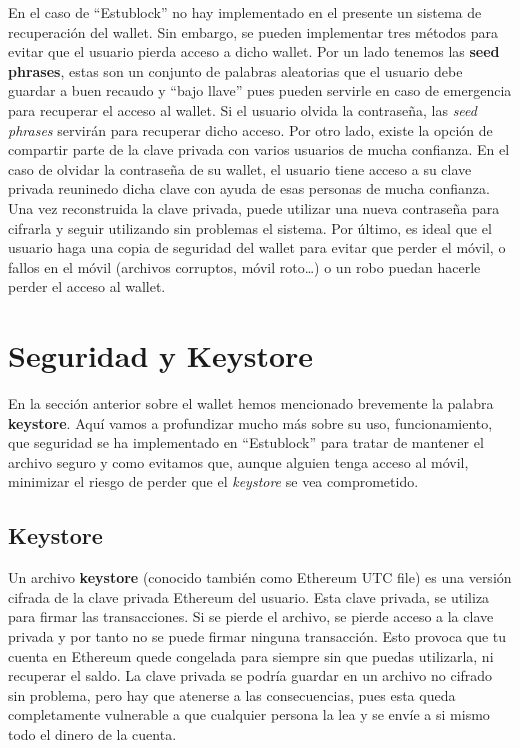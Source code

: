 En el caso de ``Estublock'' no hay implementado en el presente un sistema de recuperación del wallet. Sin embargo, se pueden implementar tres métodos para evitar que el usuario pierda acceso a dicho wallet. Por un lado tenemos las \textbf{seed phrases}, estas son un conjunto de palabras aleatorias que el usuario debe guardar a buen recaudo y ``bajo llave'' pues pueden servirle en caso de emergencia para recuperar el acceso al wallet. Si el usuario olvida la contraseña, las \emph{seed phrases} servirán para recuperar dicho acceso. Por otro lado, existe la opción de compartir parte de la clave privada con varios usuarios de mucha confianza. En el caso de olvidar la contraseña de su wallet, el usuario tiene acceso a su clave privada reuninedo dicha clave con ayuda de esas personas de mucha confianza. Una vez reconstruida la clave privada, puede utilizar una nueva contraseña para cifrarla y seguir utilizando sin problemas el sistema. Por último, es ideal que el usuario haga una copia de seguridad del wallet para evitar que perder el móvil, o fallos en el móvil (archivos corruptos, móvil roto\dots) o un robo puedan hacerle perder el acceso al wallet. 



\section{Seguridad y Keystore}

En la sección anterior sobre el wallet hemos mencionado brevemente la palabra \textbf{keystore}. Aquí vamos a profundizar mucho más sobre su uso, funcionamiento, que seguridad se ha implementado en ``Estublock'' para tratar de mantener el archivo seguro y como evitamos que, aunque alguien tenga acceso al móvil, minimizar el riesgo de perder que el \emph{keystore} se vea comprometido. \\

\subsection{Keystore}

Un archivo \textbf{keystore} (conocido también como Ethereum UTC file) es una versión cifrada de la clave privada Ethereum del usuario. Esta clave privada, se utiliza para firmar las transacciones. Si se pierde el archivo, se pierde acceso a la clave privada y por tanto no se puede firmar ninguna transacción. Esto provoca que tu cuenta en Ethereum quede congelada para siempre sin que puedas utilizarla, ni recuperar el saldo. La clave privada se podría guardar en un archivo no cifrado sin problema, pero hay que atenerse a las consecuencias, pues esta queda completamente vulnerable a que cualquier persona la lea y se envíe a si mismo todo el dinero de la cuenta. \\


